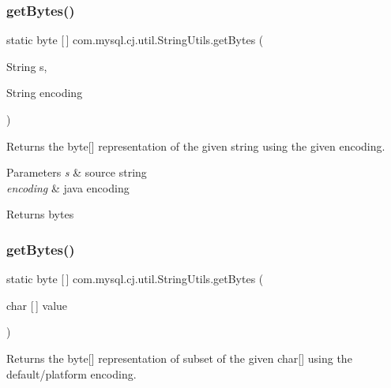 \subsubsection{\texorpdfstring{get\+Bytes()}{getBytes()}\hspace{0.1cm}{\footnotesize\ttfamily [1/4]}}
{\footnotesize\ttfamily static byte \mbox{[}$\,$\mbox{]} com.\+mysql.\+cj.\+util.\+String\+Utils.\+get\+Bytes (\begin{DoxyParamCaption}\item[{String}]{s,  }\item[{String}]{encoding }\end{DoxyParamCaption})\hspace{0.3cm}{\ttfamily [static]}}

Returns the byte\mbox{[}\mbox{]} representation of the given string using the given encoding.


\begin{DoxyParams}{Parameters}
{\em s} & source string \\
\hline
{\em encoding} & java encoding \\
\hline
\end{DoxyParams}
\begin{DoxyReturn}{Returns}
bytes 
\end{DoxyReturn}
\mbox{\label{classcom_1_1mysql_1_1cj_1_1util_1_1_string_utils_a8511f19038629bb79919340b70bf263b}} 
\subsubsection{\texorpdfstring{get\+Bytes()}{getBytes()}\hspace{0.1cm}{\footnotesize\ttfamily [2/4]}}
{\footnotesize\ttfamily static byte \mbox{[}$\,$\mbox{]} com.\+mysql.\+cj.\+util.\+String\+Utils.\+get\+Bytes (\begin{DoxyParamCaption}\item[{char \mbox{[}$\,$\mbox{]}}]{value }\end{DoxyParamCaption})\hspace{0.3cm}{\ttfamily [static]}}

Returns the byte\mbox{[}\mbox{]} representation of subset of the given char\mbox{[}\mbox{]} using the default/platform encoding.


